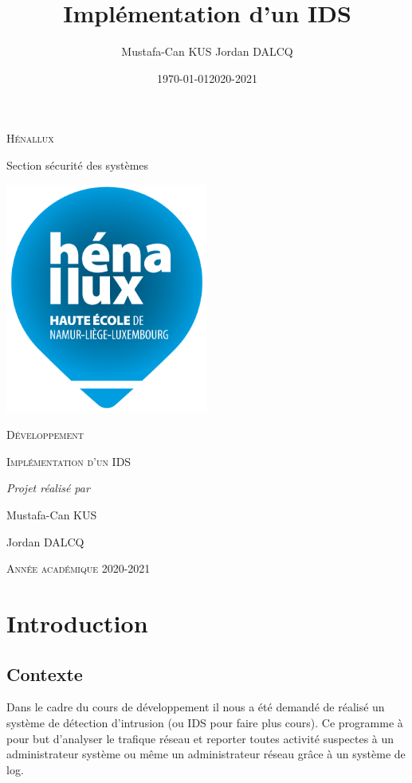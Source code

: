 \documentclass[a4paper]{report}
\date{\today}
\title{}
\begin{document}
\begin{LaTex}
\begin{titlepage}
\centering
  {\scshape Hénallux\par\vspace{0.2cm} Section sécurité des systèmes\par \vspace{0.2cm}}
  \vspace{1cm}
  \includegraphics[width=0.5\textwidth]{img/school}\par\vspace{1cm}
  {\scshape \LARGE Développement \par}
  \vspace{0.2cm}
	{\scshape \Large Implémentation d'un IDS\par}
  \vspace{3cm}
  {\Large\itshape Projet réalisé par \par\vspace{0.5cm} Mustafa-Can KUS \par Jordan DALCQ \par}
  \vfill
  \scshape Année académique 2020-2021 
  \title{Implémentation d'un IDS}
  \author{Mustafa-Can KUS Jordan DALCQ}
  \date{2020-2021}
\end{titlepage}

\pagestyle{headings}
\end{LaTex}
\tableofcontents

\part{Introduction}
\label{sec:org7800537}
\chapter{Contexte}
\label{sec:orgb0ec95b}
Dans le cadre du cours de développement il nous a été demandé de réalisé un système de détection d'intrusion (ou IDS pour faire plus cours).
Ce programme à pour but d'analyser le trafique réseau et reporter toutes activité suspectes à un administrateur système ou même un administrateur réseau
grâce à un système de log.
\end{document}
